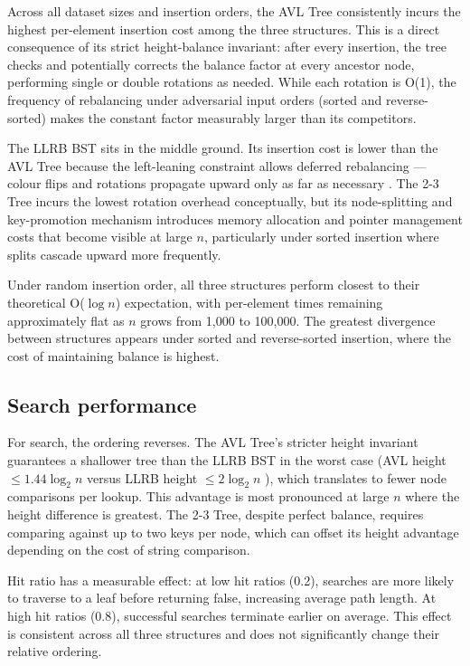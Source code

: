 \documentclass[12pt]{article}
\begin{document}
Across all dataset sizes and insertion orders, the AVL Tree consistently incurs the highest per-element insertion cost among the three structures. This is a direct consequence of its strict height-balance invariant: after every insertion, the tree checks and potentially corrects the balance factor at every ancestor node, performing single or double rotations as needed. While each rotation is O(1), the frequency of rebalancing under adversarial input orders (sorted and reverse-sorted) makes the constant factor measurably larger than its competitors.

The LLRB BST sits in the middle ground. Its insertion cost is lower than the AVL Tree because the left-leaning constraint allows deferred rebalancing --- colour flips and rotations propagate upward only as far as necessary \cite{sedgewick2011}. The 2-3 Tree incurs the lowest rotation overhead conceptually, but its node-splitting and key-promotion mechanism introduces memory allocation and pointer management costs that become visible at large $n$, particularly under sorted insertion where splits cascade upward more frequently.

Under random insertion order, all three structures perform closest to their theoretical O($\log n$) expectation, with per-element times remaining approximately flat as $n$ grows from 1,000 to 100,000. The greatest divergence between structures appears under sorted and reverse-sorted insertion, where the cost of maintaining balance is highest.

\subsection*{Search performance}

For search, the ordering reverses. The AVL Tree's stricter height invariant guarantees a shallower tree than the LLRB BST in the worst case (AVL height $\leq 1.44 \log_2 n$ versus LLRB height $\leq 2 \log_2 n$ \cite{sedgewick2011}), which translates to fewer node comparisons per lookup. This advantage is most pronounced at large $n$ where the height difference is greatest. The 2-3 Tree, despite perfect balance, requires comparing against up to two keys per node, which can offset its height advantage depending on the cost of string comparison.

Hit ratio has a measurable effect: at low hit ratios (0.2), searches are more likely to traverse to a leaf before returning false, increasing average path length. At high hit ratios (0.8), successful searches terminate earlier on average. This effect is consistent across all three structures and does not significantly change their relative ordering.
\end{document}
